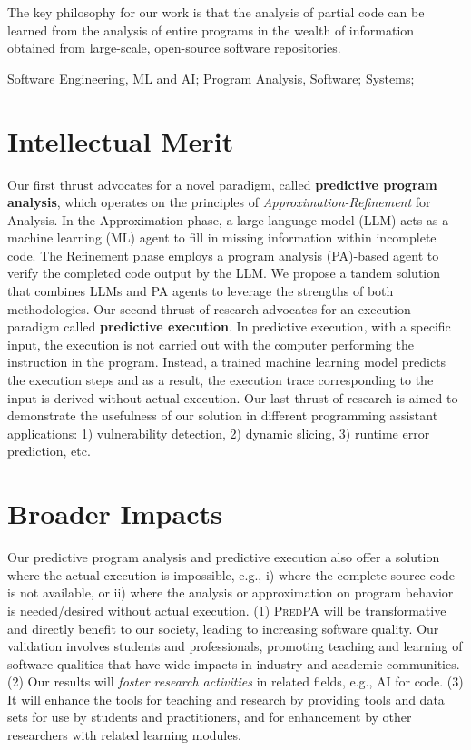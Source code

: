 \documentclass[11pt]{article}
\newcommand{\tool}{\textsc{PredPA}\xspace}
\begin{document}
The key philosophy for our work is that the analysis of
partial code can be learned from the analysis of entire programs in
the wealth of information obtained from large-scale, open-source
software repositories.


 Software Engineering, ML and AI; Program Analysis, Software; Systems;

\section{Intellectual Merit}

Our first thrust advocates for a novel paradigm, called {\bf
  predictive program analysis}, which operates on the principles of
{\em Approximation-Refinement} for Analysis. In the Approximation
phase, a large language model (LLM) acts as a machine learning (ML)
agent to fill in missing information within incomplete code. The
Refinement phase employs a program analysis (PA)-based agent to verify
the completed code output by the LLM. We propose a tandem solution
that combines LLMs and PA agents to leverage the strengths of both
methodologies. Our second thrust of research advocates for an
execution paradigm called {\bf predictive execution}. In predictive
execution, with a specific input, the execution is not carried out
with the computer performing the instruction in the program. Instead,
a trained machine learning model predicts the execution steps and as a
result, the execution trace corresponding to the input is derived
without actual execution. Our last thrust of research is aimed to
demonstrate the usefulness of our solution in different programming
assistant applications: 1) vulnerability detection, 2) dynamic
slicing, 3) runtime error prediction, etc.

\section{Broader Impacts}


Our predictive program analysis and predictive execution also offer a
solution where the actual execution is impossible, e.g., i) where the complete source code is
not available, or ii) where the analysis or approximation on
program behavior is needed/desired without actual execution. (1)
{\tool} will be transformative and directly benefit to our
  society, leading to increasing software quality.  Our validation
involves students and professionals, promoting teaching and learning
of software qualities that have wide impacts in industry and academic
communities. (2) Our results will {\em foster research activities} in
related fields, e.g., AI for code. (3) It will
enhance the tools for teaching and research by providing tools and
data sets for use by students and practitioners, and for enhancement
by other researchers with related learning modules.
\end{document}
